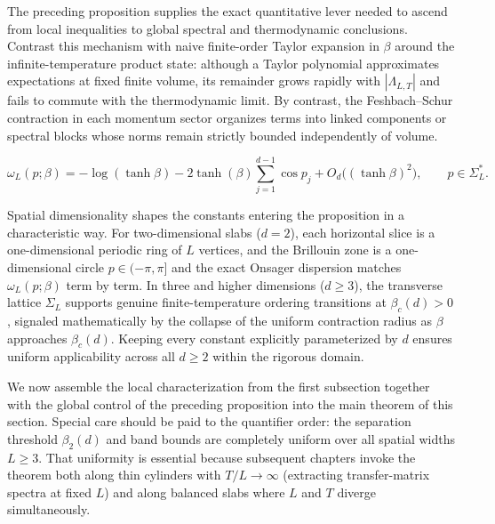 \documentclass[11pt]{article}
\theoremstyle{definition}
\begin{document}
The preceding proposition supplies the exact quantitative lever needed to ascend
from local inequalities to global spectral and thermodynamic conclusions. Contrast
this mechanism with naive finite-order Taylor expansion in $\beta$ around the
infinite-temperature product state: although a Taylor polynomial approximates
expectations at fixed finite volume, its remainder grows rapidly with
$|\Lambda_{L,T}|$ and fails to commute with the thermodynamic limit. By contrast,
the Feshbach--Schur contraction in each momentum sector organizes terms into linked
components or spectral blocks whose norms remain strictly bounded independently of
volume.

\[
  \omega_L(p; \beta) = -\log(\tanh \beta) - 2 \tanh(\beta) \sum_{j=1}^{d-1} \cos p_j + O_d\!\bigl((\tanh \beta)^2\bigr), \qquad p \in \Sigma_L^*.
\]

Spatial dimensionality shapes the constants entering the proposition in a
characteristic way. For two-dimensional slabs ($d = 2$), each horizontal slice is a
one-dimensional periodic ring of $L$ vertices, and the Brillouin zone is a
one-dimensional circle $p \in (-\pi, \pi]$ and the exact Onsager dispersion matches
$\omega_L(p; \beta)$ term by term. In three and higher dimensions ($d \ge 3$), the
transverse lattice $\Sigma_L$ supports genuine finite-temperature ordering
transitions at $\beta_c(d) > 0$, signaled mathematically by the collapse of the
uniform contraction radius as $\beta$ approaches $\beta_c(d)$. Keeping every
constant explicitly parameterized by $d$ ensures uniform applicability across all $d
\ge 2$ within the rigorous domain.

We now assemble the local characterization from the first subsection together with
the global control of the preceding proposition into the main theorem of this
section. Special care should be paid to the quantifier order: the separation
threshold $\beta_2(d)$ and band bounds are completely uniform over all spatial
widths $L \ge 3$. That uniformity is essential because subsequent chapters invoke
the theorem both along thin cylinders with $T/L \to \infty$ (extracting
transfer-matrix spectra at fixed $L$) and along balanced slabs where $L$ and $T$
diverge simultaneously.
\end{document}
